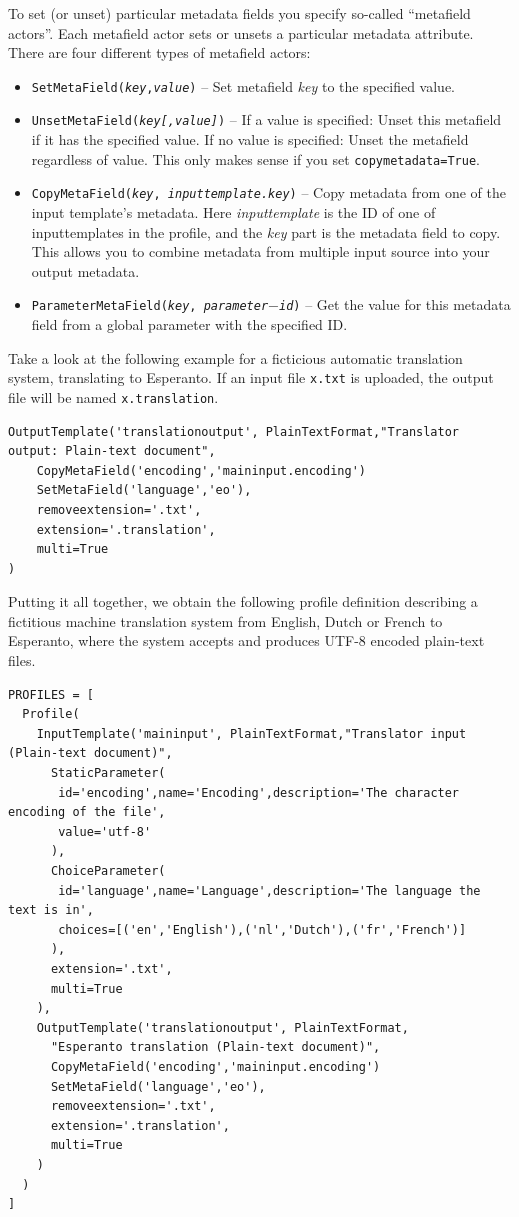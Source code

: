 \documentclass[a4paper,12pt]{report}
\begin{document}
To set (or unset) particular metadata fields you specify so-called ``metafield actors''. Each metafield actor sets or unsets a particular metadata attribute. There are four different types of metafield actors:

\begin{itemize}
\item \texttt{SetMetaField(\emph{key},\emph{value})} -- Set metafield \emph{key} to the specified value.
\item \texttt{UnsetMetaField(\emph{key}\emph{[,value]})} -- If a value is specified: Unset this metafield if it has the specified value. If no value is specified: Unset the metafield regardless of value. This only makes sense if you set \texttt{copymetadata=True}.
\item \texttt{CopyMetaField(\emph{key}, \emph{inputtemplate.key})} -- Copy metadata from one of the input template's metadata. Here \emph{inputtemplate} is the ID of one of inputtemplates in the profile, and the \emph{key} part is the metadata field to copy. This allows you to combine metadata from multiple input source into your output metadata.
\item \texttt{ParameterMetaField(\emph{key}, \emph{parameter$-$id})} -- Get the value for this metadata field from a global parameter with the specified ID.
\end{itemize}

Take a look at the following example for a ficticious automatic translation system, translating to Esperanto. If an input file \texttt{x.txt} is uploaded, the output file will be named \texttt{x.translation}.

{\footnotesize{
\begin{verbatim}
OutputTemplate('translationoutput', PlainTextFormat,"Translator output: Plain-text document",  
    CopyMetaField('encoding','maininput.encoding')
    SetMetaField('language','eo'),
    removeextension='.txt',
    extension='.translation',
    multi=True
)
\end{verbatim}
}}

Putting it all together, we obtain the following profile definition describing a fictitious machine translation system from English, Dutch or French to Esperanto, where the system accepts and produces UTF-8 encoded plain-text files.

{\footnotesize{
\begin{verbatim}
PROFILES = [ 
  Profile( 
    InputTemplate('maininput', PlainTextFormat,"Translator input (Plain-text document)",  
      StaticParameter(
       id='encoding',name='Encoding',description='The character encoding of the file', 
       value='utf-8'
      ),  
      ChoiceParameter(
       id='language',name='Language',description='The language the text is in', 
       choices=[('en','English'),('nl','Dutch'),('fr','French')]
      ),
      extension='.txt',
      multi=True
    ), 
    OutputTemplate('translationoutput', PlainTextFormat,
      "Esperanto translation (Plain-text document)",  
      CopyMetaField('encoding','maininput.encoding')
      SetMetaField('language','eo'),
      removeextension='.txt',
      extension='.translation',
      multi=True
    )    
  )
]
\end{verbatim}
}}
\end{document}
